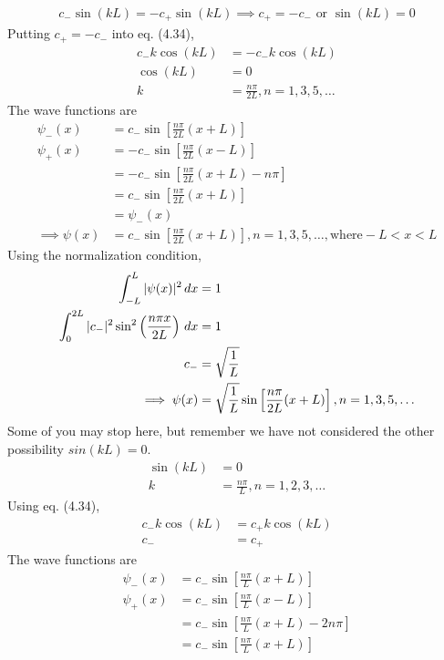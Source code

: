 \documentclass[12pt]{book} %
\numberwithin{equation}{chapter}
\begin{document}
\begin{solbox}
\begin{align*}
c_{-}\sin(kL)=-c_{+}\sin(kL)\implies c_{+}=-c_{-}\text{ or }\sin(kL)=0
\end{align*}
Putting $c_{+}=-c_{-}$ into eq. (4.34),
\begin{align*}
c_{-}k\cos(kL)&=-c_{-}k\cos(kL)\\
\cos(kL)&=0\\
k&=\frac{n\pi}{2L}, n=1, 3, 5, \dots
\end{align*}
The wave functions are
\begin{align*}
\psi_{-}(x)&=c_{-}\sin\left[\frac{n\pi}{2L}(x+L)\right]\\
\psi_{+}(x)&=-c_{-}\sin\left[\frac{n\pi}{2L}(x-L)\right]\\
&=-c_{-}\sin\left[\frac{n\pi}{2L}(x+L)-n\pi\right]\\
&=c_{-}\sin\left[\frac{n\pi}{2L}(x+L)\right]\\
&=\psi_{-}(x)\\
\implies \psi(x)&=c_{-}\sin\left[\frac{n\pi}{2L}(x+L)\right], n=1, 3, 5, \dots, \text{where}-L<x<L
\end{align*}
Using the normalization condition,
\begin{align}
\int_{-L}^{L}|\psi(x)|^{2}\,dx&=1\notag\\
\int_{0}^{2L}|c_{-}|^{2}\sin^{2}\left(\frac{n\pi x}{2L}\right)\,dx&=1\notag\\
c_{-}&=\sqrt{\frac{1}{L}}\notag\\
\implies \psi(x)&=\sqrt{\frac{1}{L}}\sin\left[\frac{n\pi}{2L}(x+L)\right], n=1, 3, 5, \dots
\end{align}
Some of you may stop here, but remember we have not considered the other possibility $sin(kL)=0$.
\begin{align*}
\sin(kL)&=0\\
k&=\frac{n\pi}{L}, n=1, 2, 3, \dots
\end{align*}
Using eq. (4.34),
\begin{align*}
c_{-}k\cos(kL)&=c_{+}k\cos(kL)\\
c_{-}&=c_{+}
\end{align*}
The wave functions are
\begin{align*}
\psi_{-}(x)&=c_{-}\sin\left[\frac{n\pi}{L}(x+L)\right]\\
\psi_{+}(x)&=c_{-}\sin\left[\frac{n\pi}{L}(x-L)\right]\\
&=c_{-}\sin\left[\frac{n\pi}{L}(x+L)-2n\pi\right]\\
&=c_{-}\sin\left[\frac{n\pi}{L}(x+L)\right]\\

\end{align*}
\end{solbox}
\end{document}
